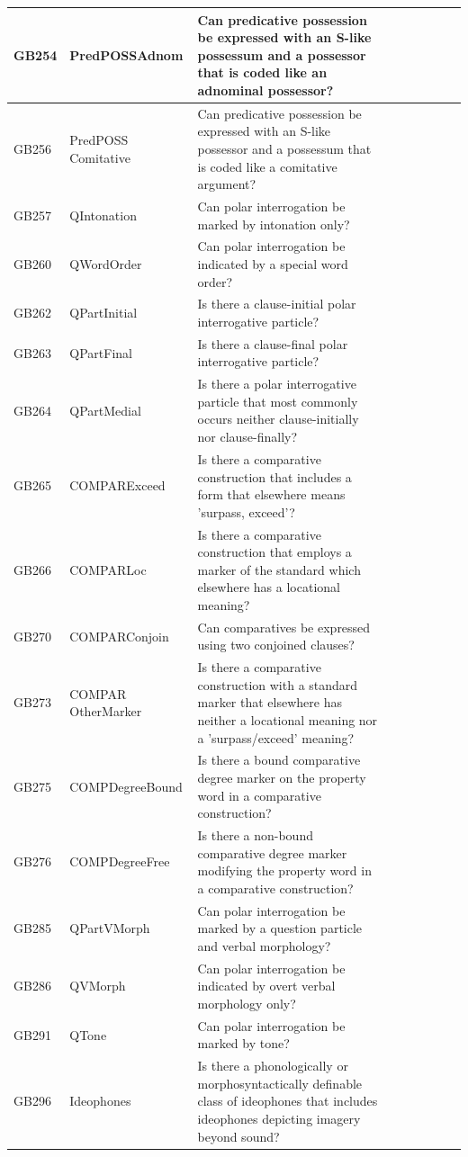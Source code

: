 \documentclass[draft,10pt]{article} %
\begin{document}
\begin{landscape}
\begin{longtable}{| l | p{4cm}| p{12cm}|p{2cm}|p{2cm}|p{2cm}|p{2cm}|p{2cm}|p{2cm}|}
GB254 & PredPOSSAdnom&Can predicative possession be expressed with an S-like possessum and a possessor that is coded like an adnominal possessor?\\ \hline
GB256 & PredPOSS Comitative&Can predicative possession be expressed with an S-like possessor and a possessum that is coded like a comitative argument?\\ \hline
GB257 & QIntonation&Can polar interrogation be marked by intonation only?\\ \hline
GB260 & QWordOrder&Can polar interrogation be indicated by a special word order?\\ \hline
GB262 & QPartInitial&Is there a clause-initial polar interrogative particle?\\ \hline
GB263 & QPartFinal&Is there a clause-final polar interrogative particle?\\ \hline
GB264 & QPartMedial&Is there a polar interrogative particle that most commonly occurs neither clause-initially nor clause-finally?\\ \hline
GB265 & COMPARExceed&Is there a comparative construction that includes a form that elsewhere means 'surpass, exceed'?\\ \hline
GB266 & COMPARLoc&Is there a comparative construction that employs a marker of the standard which elsewhere has a locational meaning?\\ \hline
GB270 & COMPARConjoin&Can comparatives be expressed using two conjoined clauses?\\ \hline
GB273 & COMPAR OtherMarker&Is there a comparative construction with a standard marker that elsewhere has neither a locational meaning nor a 'surpass/exceed' meaning?\\ \hline
GB275 & COMPDegreeBound&Is there a bound comparative degree marker on the property word in a comparative construction?\\ \hline
GB276 & COMPDegreeFree&Is there a non-bound comparative degree marker modifying the property word in a comparative construction?\\ \hline
GB285 & QPartVMorph&Can polar interrogation be marked by a question particle and verbal morphology?\\ \hline
GB286 & QVMorph&Can polar interrogation be indicated by overt verbal morphology only?\\ \hline
GB291 & QTone&Can polar interrogation be marked by tone?\\ \hline
GB296 & Ideophones&Is there a phonologically or morphosyntactically definable class of ideophones that includes ideophones depicting imagery beyond sound?\\ \hline

\end{longtable}
\end{landscape}
\end{document}
